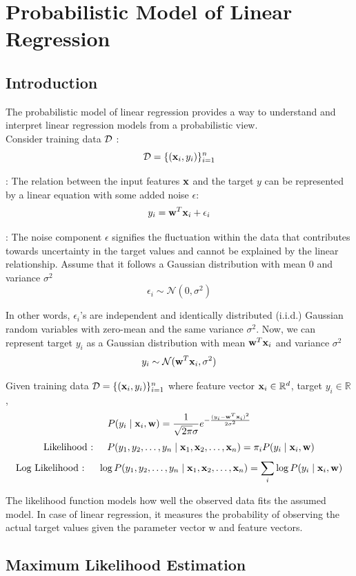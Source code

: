 \chapter{Probabilistic Model of Linear Regression}
\section{Introduction}

The probabilistic model of linear regression provides a way to understand and interpret linear regression models from a probabilistic view. \\

Consider training data $\mathcal{D}$ :
$$
  \mathcal{D} = \{(\mathbf{x}_i,y_i)\}_{i=1}^n
$$

: The relation between the input features $\mathbf{x}$ and the target $y$ can be represented by a linear equation with some added noise $\epsilon$:
$$
  y_i = \mathbf{w}^T\mathbf{x}_i + \epsilon_i
$$

: The noise component $\epsilon$ signifies the fluctuation within the data that contributes towards uncertainty in the target values and cannot be explained by the linear relationship. Assume that it follows a Gaussian distribution with mean 0 and variance $\sigma^2$
$$
  \epsilon_i \sim \mathcal{N}(0, \sigma^2)
$$

In other words, $\epsilon_i$'s are independent and identically distributed (i.i.d.) Gaussian random variables with zero-mean and the same variance $\sigma^2$. Now, we can represent target $y_i$ as a Gaussian distribution with mean $\mathbf{w}^T\mathbf{x}_i$ and variance $\sigma^2$
$$
  y_i \sim \mathcal{N}(\mathbf{w}^T\mathbf{x}_i, \sigma^2)
$$

Given training data $\mathcal{D} = \{(\mathbf{x}_i, y_i)\}_{i=1}^{n}$ where feature vector $\mathbf{x}_i \in \mathbb{R}^{d}$, target $y_i \in \mathbb{R}$,
$$
  P(y_i \mid \mathbf{x}_i, \mathbf{w})=\frac{1}{\sqrt{2\pi}\sigma} e^{-\frac{(y_i - \mathbf{w}^T\mathbf{x}_i)^2}{2\sigma^2}}
$$
$$
  \text{Likelihood : } \quad P(y_1, y_2, \ldots, y_n \mid \mathbf{x}_1, \mathbf{x}_2, \ldots, \mathbf{x}_n) = \pi_i P(y_i \mid \mathbf{x}_i, \mathbf{w})
$$
$$
  \text{Log Likelihood : } \quad \log P(y_1, y_2, \ldots, y_n \mid \mathbf{x}_1, \mathbf{x}_2, \ldots, \mathbf{x}_n) = \underset{i}{\sum} \log P(y_i \mid \mathbf{x}_i, \mathbf{w})
$$

The likelihood function models how well the observed data fits the assumed model. In case of linear regression, it measures the probability of observing the actual target values given the parameter vector w and feature vectors.

\section{Maximum Likelihood Estimation}

